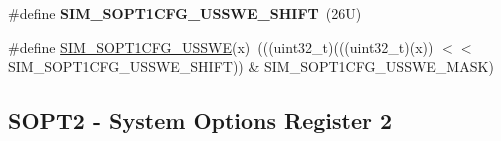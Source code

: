 \begin{DoxyCompactItemize}
\item 
\mbox{\label{group___s_i_m___register___masks_ga6984c7260abd4b7caccff970332eb4be}} 
\#define {\bfseries S\+I\+M\+\_\+\+S\+O\+P\+T1\+C\+F\+G\+\_\+\+U\+S\+S\+W\+E\+\_\+\+S\+H\+I\+FT}~(26\+U)
\item 
\#define \mbox{\hyperlink{group___s_i_m___register___masks_ga9df9793edc59c4dbb53f488b149982d5}{S\+I\+M\+\_\+\+S\+O\+P\+T1\+C\+F\+G\+\_\+\+U\+S\+S\+WE}}(x)~(((uint32\+\_\+t)(((uint32\+\_\+t)(x)) $<$$<$ S\+I\+M\+\_\+\+S\+O\+P\+T1\+C\+F\+G\+\_\+\+U\+S\+S\+W\+E\+\_\+\+S\+H\+I\+FT)) \& S\+I\+M\+\_\+\+S\+O\+P\+T1\+C\+F\+G\+\_\+\+U\+S\+S\+W\+E\+\_\+\+M\+A\+SK)
\end{DoxyCompactItemize}
\subsection*{S\+O\+P\+T2 -\/ System Options Register 2}
